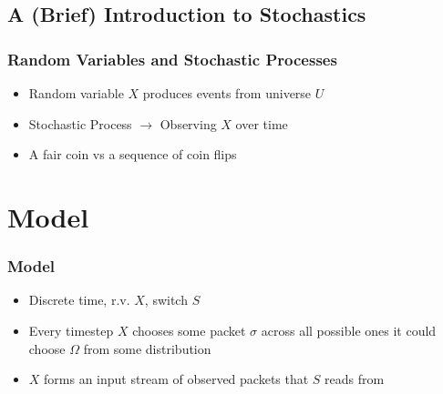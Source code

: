 \documentclass{beamer}
\begin{document}
\subsection{A (Brief) Introduction to Stochastics}
\begin{frame}
  \frametitle{Random Variables and Stochastic Processes}
  \begin{itemize}
    \item<2-> Random variable $X$ produces events from universe $U$
    \item<3-> Stochastic Process $\rightarrow$ Observing $X$ over time
    \item<4-> A fair coin vs a sequence of coin flips
  \end{itemize}
\end{frame}



\section{Model}
\begin{frame}
  \frametitle{Model}
  \begin{itemize}
    \item<2-> Discrete time, r.v. $X$, switch $S$
    \item<3-> Every timestep $X$ chooses some packet $\sigma$ across all possible ones it could choose $\Omega$ from some distribution
    \item<4-> $X$ forms an input stream of observed packets that $S$ reads from
  \end{itemize}
\end{frame}
\end{document}
